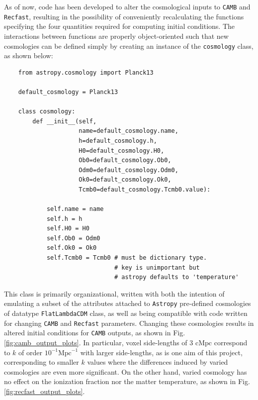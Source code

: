 \documentclass[floats,floatfix,showpacs,amssymb,prd,superscriptaddress,nofootinbib]{revtex4-2} %
\newcommand{\code}{\texttt}
\begin{document}

As of now, code has been developed to alter the cosmological inputs to \code{CAMB} and \code{Recfast}, resulting in the possibility of conveniently recalculating the functions specifying the four quantities required for computing initial conditions. The interactions between functions are properly object-oriented such that new cosmologies can be defined simply by creating an instance of the \code{cosmology} class, as shown below: 

\begin{verbatim}
    from astropy.cosmology import Planck13

    default_cosmology = Planck13
    
    class cosmology:
        def __init__(self, 
                     name=default_cosmology.name, 
                     h=default_cosmology.h, 
                     H0=default_cosmology.H0, 
                     Ob0=default_cosmology.Ob0, 
                     Odm0=default_cosmology.Odm0, 
                     Ok0=default_cosmology.Ok0, 
                     Tcmb0=default_cosmology.Tcmb0.value):
            
            self.name = name
            self.h = h
            self.H0 = H0
            self.Ob0 = Odm0
            self.Ok0 = Ok0
            self.Tcmb0 = Tcmb0 # must be dictionary type. 
                               # key is unimportant but 
                               # astropy defaults to 'temperature'
\end{verbatim}

This class is primarily organizational, written with both the intention of emulating a subset of the attributes attached to \code{Astropy} pre-defined cosmologies of datatype \code{FlatLambdaCDM} class, as well as being compatible with code written for changing \code{CAMB} and \code{Recfast} parameters. Changing these cosmologies results in altered initial conditions for \code{CAMB} outputs, as shown in Fig. \ref{fig:camb_output_plots}. In particular, voxel side-lengths of $3 \text{ cMpc}$ correspond to $k$ of order $10^{-1} \text{Mpc}^{-1}$ with larger side-lengths, as is one aim of this project, corresponding to smaller $k$ values where the differences induced by varied cosmologies are even more significant. On the other hand, varied cosmology has no effect on the ionization fraction nor the matter temperature, as shown in Fig. \ref{fig:recfast_output_plots}. 
\end{document}
